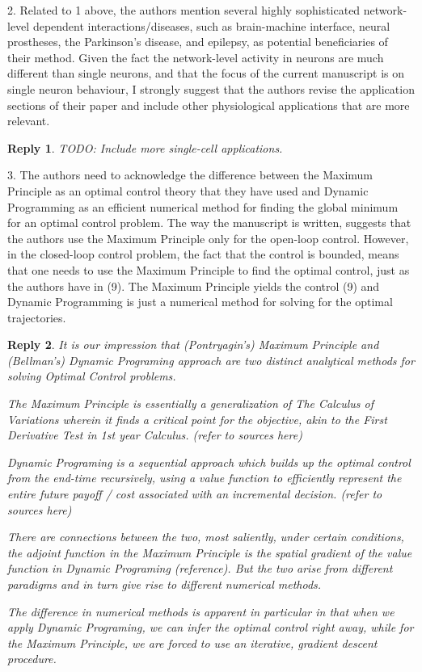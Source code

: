 \documentclass{article}
\newtheorem*{rep}{Reply}
\begin{document}
2. Related to 1 above, the authors mention several highly sophisticated
network-level dependent interactions/diseases, such as brain-machine interface,
neural prostheses, the Parkinson's disease, and epilepsy, as potential
beneficiaries of their method. Given the fact the network-level activity in
neurons are much different than single neurons, and that the focus of the
current manuscript is on single neuron behaviour, I strongly suggest that the
authors revise the application sections of their paper and include other
physiological applications that are more relevant.
\begin{rep}
TODO: Include more single-cell applications.
\end{rep}
3. The authors need to acknowledge the difference between the Maximum Principle
as an optimal control theory that they have used and Dynamic Programming as an
efficient numerical method for finding the global minimum for an optimal control
problem. The way the manuscript is written, suggests that the authors use the
Maximum Principle only for the open-loop control. However, in the closed-loop
control problem, the fact that the control is bounded, means that one needs to
use the Maximum Principle to find the optimal control, just as the authors have
in (9). The Maximum Principle yields the control (9) and Dynamic Programming is
just a numerical method for solving for the optimal trajectories.
\begin{rep}
It is our impression that (Pontryagin's) Maximum Principle and (Bellman's)
Dynamic Programing approach are two distinct analytical methods for solving
Optimal Control problems.

The Maximum Principle is essentially a generalization of The Calculus of
Variations wherein it finds a critical point for the objective, akin to the
First Derivative Test in 1st year Calculus.
(refer to sources here)

Dynamic Programing is a sequential approach which builds up the optimal control
from the end-time recursively, using a value function to efficiently represent
the entire future payoff / cost associated with an incremental decision. (refer to
sources here)

There are connections between the two, most saliently, under certain conditions,
the adjoint function in the Maximum Principle is the spatial gradient of the
value function in Dynamic Programing (reference). But the two arise from
different paradigms and in turn give rise to different numerical methods. 

The difference in numerical methods is apparent in particular in that when we
apply Dynamic Programing, we can infer the optimal control right away, while for
the Maximum Principle, we are forced to use an iterative, gradient descent
procedure.


\end{rep}
\end{document}
